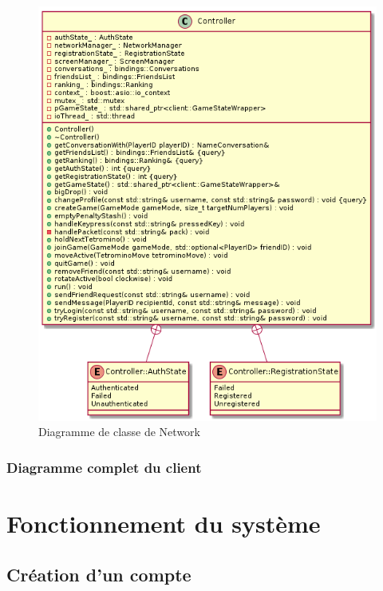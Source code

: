 \documentclass{article}
\begin{document}
\begin{figure}[!ht]
	\centering
	 \includegraphics[scale=0.5]{../res/uml/class/ControllerClass.png}
	 \caption{Diagramme de classe de Network}
	 \label{fig:ControllerDiagram}
\end{figure}

\subsubsection{Diagramme complet du client}

\section{Fonctionnement du système}

\subsection{Création d'un compte}
\end{document}
